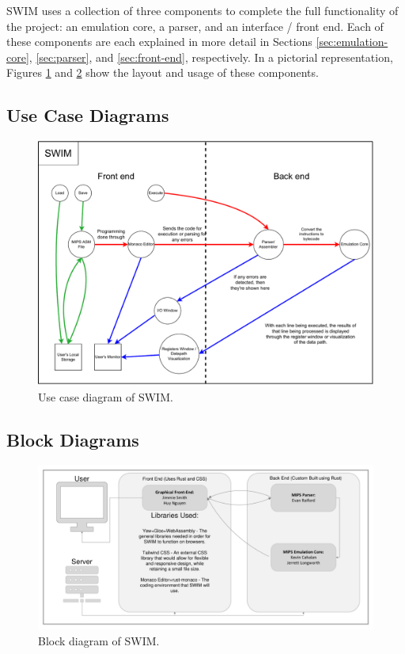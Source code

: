 \documentclass[
    paper=letter,
    parskip=half,
    fontsize=12pt,
    titlepage=firstiscover,
    toc=bibliography,
    numbers=endperiod
]{scrartcl}
\begin{document}
SWIM uses a collection of three components to complete the full
functionality of the project: an emulation core, a parser, and an
interface / front end. Each of these components are each explained in
more detail in Sections \ref{sec:emulation-core}, \ref{sec:parser}, and
\ref{sec:front-end}, respectively. In a pictorial representation,
Figures \ref{fig:use-case-diagram} and \ref{fig:block-diagram} show the
layout and usage of these components.

\subsection{Use Case Diagrams}

\begin{figure}[H]
    \includegraphics[width=\textwidth]{use-case-diagram}
    \caption{Use case diagram of SWIM.}
    \label{fig:use-case-diagram}
\end{figure}


\subsection{Block Diagrams}

\begin{figure}[H]
    \includegraphics[width=\textwidth]{block-diagram}
    \caption{Block diagram of SWIM.}
    \label{fig:block-diagram}
\end{figure}
\end{document}
